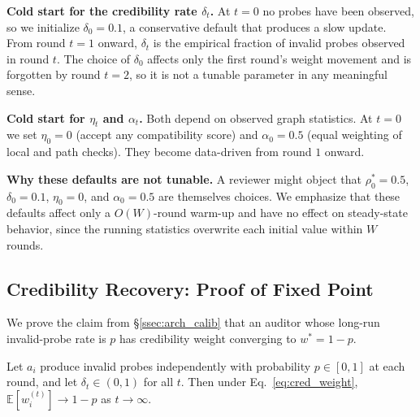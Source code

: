 \textbf{Cold start for the credibility rate $\delta_t$.}
At $t = 0$ no probes have been observed, so we initialize $\delta_0 =
0.1$, a conservative default that produces a slow update. From round
$t = 1$ onward, $\delta_t$ is the empirical fraction of invalid
probes observed in round $t$. The choice of $\delta_0$ affects only
the first round's weight movement and is forgotten by round $t = 2$,
so it is not a tunable parameter in any meaningful sense.

\textbf{Cold start for $\eta_t$ and $\alpha_t$.}
Both depend on observed graph statistics. At $t = 0$ we set $\eta_0 =
0$ (accept any compatibility score) and $\alpha_0 = 0.5$ (equal
weighting of local and path checks). They become data-driven from
round $1$ onward.

\textbf{Why these defaults are not tunable.}
A reviewer might object that $\rho^*_0 = 0.5$, $\delta_0 = 0.1$,
$\eta_0 = 0$, and $\alpha_0 = 0.5$ are themselves choices. We
emphasize that these defaults affect only a $O(W)$-round warm-up and
have no effect on steady-state behavior, since the running statistics
overwrite each initial value within $W$ rounds.

\subsection{Credibility Recovery: Proof of Fixed Point}
\label{app:credibility}

We prove the claim from \S\ref{ssec:arch_calib} that an auditor whose
long-run invalid-probe rate is $p$ has credibility weight converging
to $w^* = 1 - p$.

\begin{proposition}
\label{prop:credibility_fp}
Let $a_i$ produce invalid probes independently with probability $p
\in [0,1]$ at each round, and let $\delta_t \in (0, 1)$ for all $t$.
Then under Eq.~\ref{eq:cred_weight}, $\mathbb{E}[w_i^{(t)}] \to 1 - p$
as $t \to \infty$.
\end{proposition}

